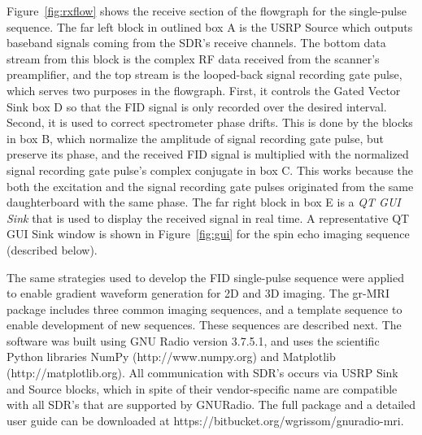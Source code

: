 \documentclass[10pt,letterpaper]{article}
\begin{document}
\par Figure~\ref{fig:rxflow} shows the receive section of the flowgraph for the single-pulse sequence.  
The far left block in outlined box A is the USRP Source which outputs baseband signals
coming from the SDR's receive channels.  
The bottom data stream from this block is the complex RF data received from the scanner's preamplifier, 
and the top stream is the looped-back signal recording gate pulse, which serves two purposes in the flowgraph.
First, it controls the Gated Vector Sink box D so that the FID signal is only recorded over the desired interval.  
Second, it is used to correct spectrometer phase drifts. 
This is done by the blocks in box B, which normalize the amplitude of signal recording gate pulse, but preserve its phase, and
the received FID signal is multiplied with the normalized signal recording gate pulse's complex conjugate in box C.
This works because the both the excitation and the signal recording gate pulses originated from the same daughterboard with the same phase.
The far right block in box E is a \textit{QT GUI Sink} that is used to display the received signal in real time.  
A representative QT GUI Sink window is shown in Figure~\ref{fig:gui} for the spin echo imaging sequence (described below).

\par The same strategies used to develop the FID single-pulse sequence 
were applied to enable gradient waveform generation for 2D and 3D imaging.
The gr-MRI package includes three common imaging sequences, 
and a template sequence to enable development of new sequences.
These sequences are described next.
The software was built using GNU Radio version 3.7.5.1, 
and uses the scientific Python libraries 
NumPy (http://www.numpy.org) and Matplotlib (http://matplotlib.org).
All communication with SDR's occurs via USRP Sink and Source blocks, 
which in spite of their vendor-specific name are compatible with all SDR's 
that are supported by GNURadio. 
The full package and a detailed user guide can be downloaded at https://bitbucket.org/wgrissom/gnuradio-mri. 
\end{document}
